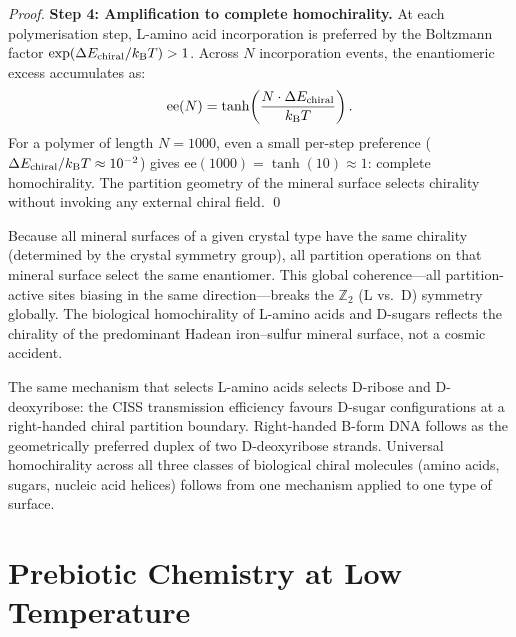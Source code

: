 \begin{proof}
\noindent\textbf{Step 4: Amplification to complete homochirality.}
At each polymerisation step, L-amino acid incorporation is preferred by the
Boltzmann factor $\exp(\Delta E_{\mathrm{chiral}}/k_{\mathrm{B}} T) > 1$. Across $N$
incorporation events, the enantiomeric excess accumulates as:
\begin{equation}
  \mathrm{ee}(N) = \tanh\!\left(\frac{N \cdot \Delta E_{\mathrm{chiral}}}{k_{\mathrm{B}} T}\right).
  \label{eq:ee_amplification}
\end{equation}
For a polymer of length $N = 1000$, even a small per-step preference
($\Delta E_{\mathrm{chiral}} / k_{\mathrm{B}} T \approx 10^{-2}$) gives
$\mathrm{ee}(1000) = \tanh(10) \approx 1$: complete homochirality. The
partition geometry of the mineral surface selects chirality without invoking
any external chiral field. \qed
\end{proof}

\begin{remark}[On Universality]
Because all mineral surfaces of a given crystal type have the same chirality
(determined by the crystal symmetry group), all partition operations on that
mineral surface select the same enantiomer. This global coherence---all
partition-active sites biasing in the same direction---breaks the $\mathbb{Z}_2$
(L vs.\ D) symmetry globally. The biological homochirality of L-amino acids
and D-sugars reflects the chirality of the predominant Hadean iron--sulfur
mineral surface, not a cosmic accident.
\end{remark}

\begin{corollary}
\label{cor:dsugars_dna}
The same mechanism that selects L-amino acids selects D-ribose and
D-deoxyribose: the CISS transmission efficiency favours D-sugar configurations
at a right-handed chiral partition boundary. Right-handed B-form DNA follows
as the geometrically preferred duplex of two D-deoxyribose strands.
Universal homochirality across all three classes of biological chiral molecules
(amino acids, sugars, nucleic acid helices) follows from one mechanism applied
to one type of surface.
\end{corollary}

\section{Prebiotic Chemistry at Low Temperature}
\label{sec:low_temp_prebiotic}

